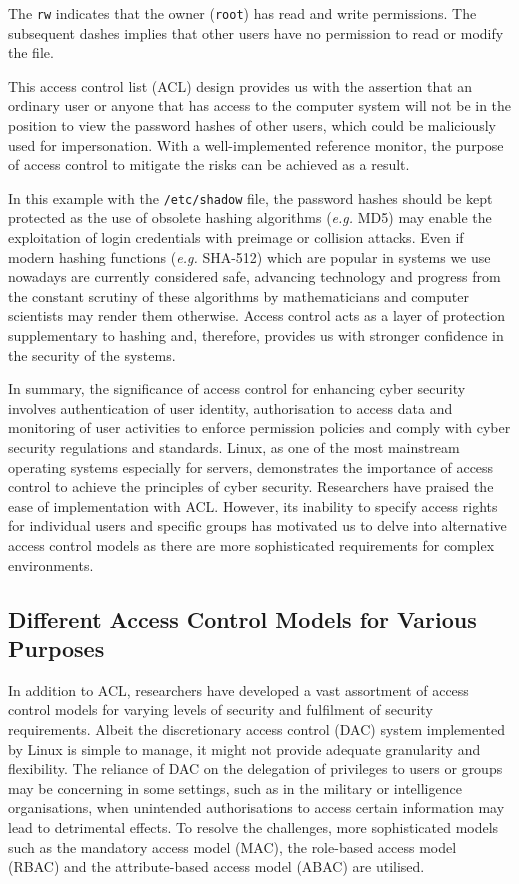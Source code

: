 \documentclass{article}
\begin{document}
The \texttt{rw} indicates that the owner (\texttt{root}) has read and write permissions. The subsequent dashes implies that other users have no permission to read or modify the file.

This access control list (ACL) design provides us with the assertion that an ordinary user or anyone that has access to the computer system will not be in the position to view the password hashes of other users, which could be maliciously used for impersonation. With a well-implemented reference monitor, the purpose of access control to mitigate the risks can be achieved as a result.

In this example with the \texttt{/etc/shadow} file, the password hashes should be kept protected as the use of obsolete hashing algorithms (\textit{e.g.} MD5) may enable the exploitation of login credentials with preimage or collision attacks. Even if modern hashing functions (\textit{e.g.} SHA-512) which are popular in systems we use nowadays are currently considered safe, advancing technology and progress from the constant scrutiny of these algorithms by mathematicians and computer scientists may render them otherwise. Access control acts as a layer of protection supplementary to hashing and, therefore, provides us with stronger confidence in the security of the systems.

In summary, the significance of access control for enhancing cyber security involves authentication of user identity, authorisation to access data and monitoring of user activities to enforce permission policies and comply with cyber security regulations and standards.\cite{principles} Linux, as one of the most mainstream operating systems especially for servers, demonstrates the importance of access control to achieve the principles of cyber security. Researchers have praised the ease of implementation with ACL. However, its inability to specify access rights for individual users and specific groups\cite{access-control-assessment} has motivated us to delve into alternative access control models as there are more sophisticated requirements for complex environments.

\subsection{Different Access Control Models for Various Purposes}

In addition to ACL, researchers have developed a vast assortment of access control models for varying levels of security and fulfilment of security requirements. Albeit the discretionary access control (DAC) system implemented by Linux is simple to manage, it might not provide adequate granularity and flexibility. The reliance of DAC on the delegation of privileges to users or groups may be concerning in some settings, such as in the military or intelligence organisations, when unintended authorisations to access certain information may lead to detrimental effects. To resolve the challenges, more sophisticated models such as the mandatory access model (MAC), the role-based access model (RBAC) and the attribute-based access model (ABAC) are utilised.
\end{document}
